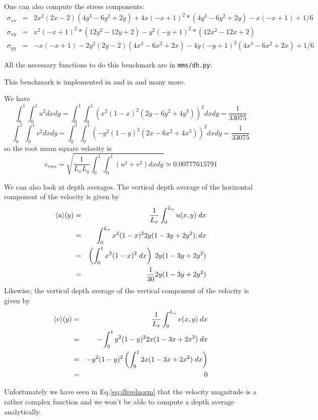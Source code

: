 One can also compute the stress components:
\begin{eqnarray}
\sigma_{xx} &=&  2x^2(2x - 2)(4y^3 - 6y^2 + 2y) + 4x(-x + 1)^2*(4y^3 - 6y^2 + 2y) - x(-x + 1) + 1/6 \\
\sigma_{xy} &=&  x^2(-x + 1)^2*(12y^2 - 12y + 2) - y^2(-y + 1)^2*(12x^2 - 12x + 2) \\
\sigma_{yy} &=&  -x(-x + 1) - 2y^2(2y - 2)(4x^3 - 6x^2 + 2x) - 4y(-y + 1)^2(4x^3 - 6x^2 + 2x) + 1/6
\end{eqnarray}

All the necessary functions to do this benchmark are in {\tt mms/dh.py}:


This benchmark is implemented in \aspect{} \cite{aspectmanual} and in  and many more.

We have
\[
\int_0^1 \int_0^1 u^2 dxdy=
\int_0^1 \int_0^1 ( x^2(1- x)^2 (2y - 6y^2 + 4y^3)  )^2 dx dy = \frac{1}{33075}
\]
\[
\int_0^1 \int_0^1 v^2 dxdy=
\int_0^1 \int_0^1 ( -y^2 (1 - y)^2 (2x - 6x^2 + 4x^3) )^2 dx dy = \frac{1}{33075}
\]
so the root mean square velocity is  
\[
v_{rms} = \sqrt{ \frac{1}{L_x L_y}  \int_0^1 \int_0^1 (u^2+v^2) dx dy } \simeq 0.00777615791
\]

We can also look at depth averages. The vertical depth average of the horizontal component
of the velocity is given by
\begin{eqnarray}
\langle u \rangle (y) 
&=& \frac{1}{L_x} \int_0^{L_x} u(x,y)\; dx \nonumber\\
&=& \int_0^{L_x} x^2(1-x)^2 2y (1-3y+2y^2) ; dx \nonumber\\
&=& \left( \int_0^{1} x^2(1-x)^2 \; dx \right) \;   2y (1-3y+2y^2)  \nonumber\\
&=& \frac{1}{30}2y (1-3y+2y^2) 
\end{eqnarray}
Likewise, the vertical depth average of the vertical component of the velocity is given by
\begin{eqnarray}
\langle v \rangle (y) 
&=& \frac{1}{L_x} \int_0^{L_x} v(x,y)\; dx \nonumber\\
&=& - \int_0^{1} y^2 (1 - y)^2 2x (1-3x+2x^2)  \; dx \nonumber\\
&=& - y^2 (1 - y)^2  \left( \int_0^{1}  2x (1-3x+2x^2)  \; dx \right) \nonumber\\
&=& 0 
\end{eqnarray}

Unfortunately we have seen in Eq.\eqref{eq:dhvelnorm} that the velocity magnitude is 
a rather complex function and we won't be able to compute a depth average analytically.




